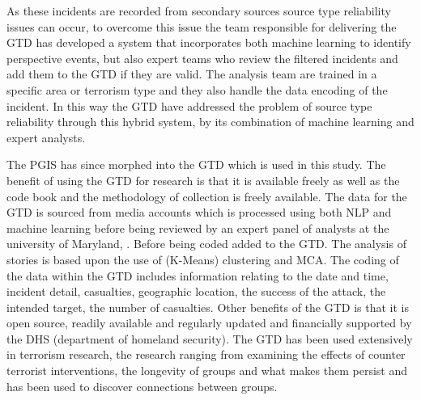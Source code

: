 As these incidents are recorded from secondary sources source type reliability issues can occur, to overcome this issue the team responsible for delivering the GTD has developed a system that incorporates both machine learning to identify perspective events, but also expert teams who review the filtered incidents and add them to the GTD if they are valid. The analysis team are trained in a specific area  or terrorism type and they also handle the data encoding of the incident. In this way the GTD have addressed the problem of source type reliability through this  hybrid system, by its combination of machine learning and expert analysts.

The PGIS has since morphed into the GTD which is used in this study. The benefit of using the GTD for research is that it is available freely as well as the code book and the methodology of collection is freely available. The data for the GTD is sourced from media accounts which is processed using both NLP and machine learning before being reviewed by an expert panel of analysts at the university of Maryland, \citep{fivethirtyeightGTD2015}. Before being coded added to the GTD. The analysis of stories is based upon the use of (K-Means) clustering and MCA. The coding of the data within the GTD includes information relating to the date and time, incident detail, casualties, geographic location, the success of the attack, the intended target, the number of casualties. Other benefits of the GTD is that it is open source, readily available and regularly updated and financially supported by the DHS (department of homeland security). 
The GTD has been used extensively in terrorism research, the research ranging from examining the effects of counter terrorist interventions, the longevity of groups and what makes them persist and  has been used to discover connections between groups.

